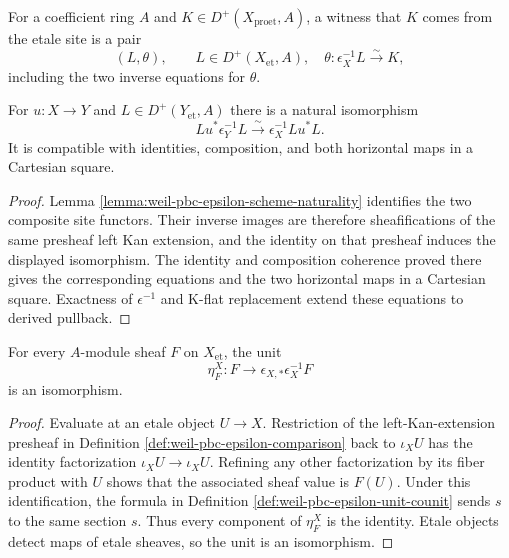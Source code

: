 \begin{definition}
\label{def:weil-pbc-comes-from-etale}
For a coefficient ring $A$ and $K\in D^+(X_{\mathrm{proet}},A)$, a witness
that $K$ comes from the etale site is a pair
\[
 (L,\theta),\qquad L\in D^+(X_{\mathrm{et}},A),\quad
 \theta:\epsilon_X^{-1}L\xrightarrow{\sim}K,
\]
including the two inverse equations for $\theta$.
\end{definition}

\begin{lemma}
\label{lemma:weil-pbc-epsilon-pullback}
For $u:X\to Y$ and $L\in D^+(Y_{\mathrm{et}},A)$ there is a natural
isomorphism
\[
 Lu^*\epsilon_Y^{-1}L\xrightarrow{\sim}
 \epsilon_X^{-1}Lu^*L.
\]
It is compatible with identities, composition, and both horizontal maps in a
Cartesian square.
\end{lemma}
\begin{proof}

Lemma \ref{lemma:weil-pbc-epsilon-scheme-naturality} identifies the two
composite site functors.  Their inverse images are therefore sheafifications
of the same presheaf left Kan extension, and the identity on that presheaf
induces the displayed isomorphism.  The identity and composition coherence
proved there gives the corresponding equations and the two horizontal maps
in a Cartesian square.  Exactness of $\epsilon^{-1}$ and K-flat replacement
extend these equations to derived pullback.
\end{proof}

\begin{lemma}
\label{lemma:weil-pbc-epsilon-unit-isomorphism}
For every $A$-module sheaf $F$ on $X_{\mathrm{et}}$, the unit
\[
 \eta^X_F:F\longrightarrow\epsilon_{X,*}\epsilon_X^{-1}F
\]
is an isomorphism.
\end{lemma}
\begin{proof}
Evaluate at an etale object $U\to X$.  Restriction of the left-Kan-extension
presheaf in Definition \ref{def:weil-pbc-epsilon-comparison} back to
$\iota_XU$ has the identity factorization
$\iota_XU\to\iota_XU$.  Refining any other factorization by its fiber product
with $U$ shows that the associated sheaf value is $F(U)$.  Under this
identification, the formula in Definition
\ref{def:weil-pbc-epsilon-unit-counit} sends $s$ to the same section $s$.
Thus every component of $\eta^X_F$ is the identity.  Etale objects detect
maps of etale sheaves, so the unit is an isomorphism.
\end{proof}

